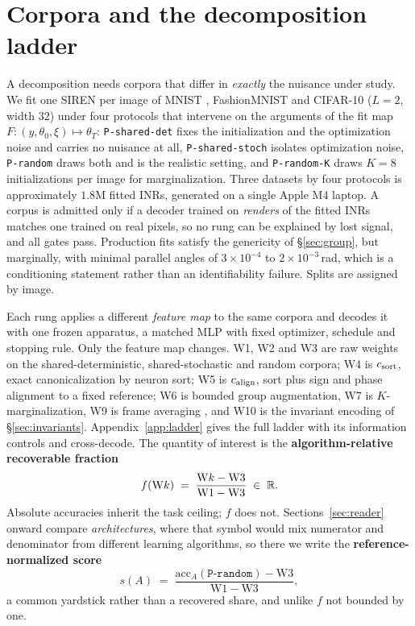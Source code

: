 \section{Corpora and the decomposition ladder}\label{sec:bench}

A decomposition needs corpora that differ in \emph{exactly} the nuisance under study. We fit one
SIREN per image of MNIST \citep{lecun1998mnist}, FashionMNIST \citep{xiao2017fashion} and CIFAR-10
\citep{krizhevsky2009cifar} ($L=2$, width $32$) under four protocols that intervene on the arguments
of the fit map $F : (y, \theta_0, \xi) \mapsto \theta_T$: \texttt{P-shared-det} fixes the
initialization and the optimization noise and carries no nuisance at all, \texttt{P-shared-stoch}
isolates optimization noise, \texttt{P-random} draws both and is the realistic setting, and
\texttt{P-random-K} draws $K=8$ initializations per image for marginalization. Three datasets by
four protocols is approximately $1.8$M fitted INRs, generated on a single Apple M4 laptop. A corpus is admitted only if a decoder trained on \emph{renders} of the fitted INRs matches one
trained on real pixels, so no rung can be explained by lost signal, and all gates pass. Production
fits satisfy the genericity of \S\ref{sec:group}, but marginally, with minimal parallel angles of
$3\times10^{-4}$ to $2\times10^{-3}$\,rad, which is a conditioning statement rather than an
identifiability failure. Splits are assigned by image.

Each rung applies a different \emph{feature map} to the same corpora and decodes it with one frozen
apparatus, a matched MLP with fixed optimizer, schedule and stopping rule. Only the feature map
changes. W1, W2 and W3 are raw weights on the shared-deterministic, shared-stochastic and random
corpora; W4 is $c_{\mathrm{sort}}$, exact canonicalization by neuron sort; W5 is $c_{\mathrm{align}}$, sort plus sign and
phase alignment to a fixed reference; W6 is bounded group augmentation, W7 is $K$-marginalization,
W9 is frame averaging \citep{puny2022frame}, and W10 is the invariant encoding of
\S\ref{sec:invariants}. Appendix~\ref{app:ladder} gives the full ladder with its information
controls and cross-decode. The quantity of interest is the \textbf{algorithm-relative recoverable
fraction}
\begin{equation}
f(\mathrm{W}k) \;=\; \frac{\mathrm{W}k - \mathrm{W3}}{\mathrm{W1} - \mathrm{W3}} \;\in\; \mathbb{R} .
\label{eq:f}
\end{equation}
Absolute accuracies inherit the task ceiling; $f$ does not. Sections~\ref{sec:reader} onward compare
\emph{architectures}, where that symbol would mix numerator and denominator from different learning
algorithms, so there we write the \textbf{reference-normalized score}
\begin{equation}
s(A) \;=\; \frac{\mathrm{acc}_A(\texttt{P-random}) - \mathrm{W3}}{\mathrm{W1} - \mathrm{W3}},
\label{eq:s}
\end{equation}
a common yardstick rather than a recovered share, and unlike $f$ not bounded by one.

